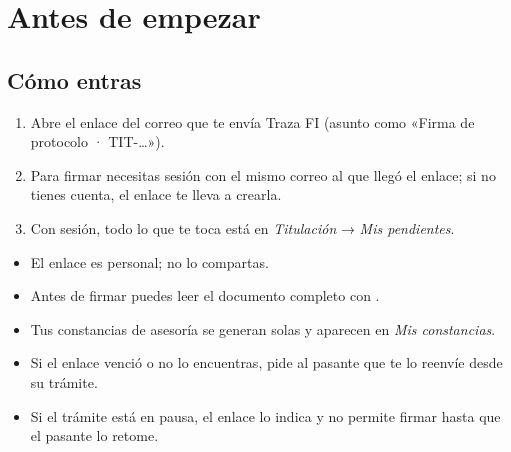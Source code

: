 \section{Antes de empezar}
\subsection*{Cómo entras}
\begin{enumerate}
  \item Abre el enlace del correo que te envía Traza FI (asunto como «Firma de protocolo · TIT-…»).
  \item Para firmar necesitas sesión con el mismo correo al que llegó el enlace; si no tienes cuenta, el enlace te lleva a crearla.
  \item Con sesión, todo lo que te toca está en \emph{Titulación} → \emph{Mis pendientes}.
\end{enumerate}
\begin{tencuenta}
\begin{itemize}
  \item El enlace es personal; no lo compartas.
  \item Antes de firmar puedes leer el documento completo con .
  \item Tus constancias de asesoría se generan solas y aparecen en \emph{Mis constancias}.
\end{itemize}
\end{tencuenta}
\begin{algosalemal}
\begin{itemize}
  \item Si el enlace venció o no lo encuentras, pide al pasante que te lo reenvíe desde su trámite.
  \item Si el trámite está en pausa, el enlace lo indica y no permite firmar hasta que el pasante lo retome.
\end{itemize}
\end{algosalemal}
